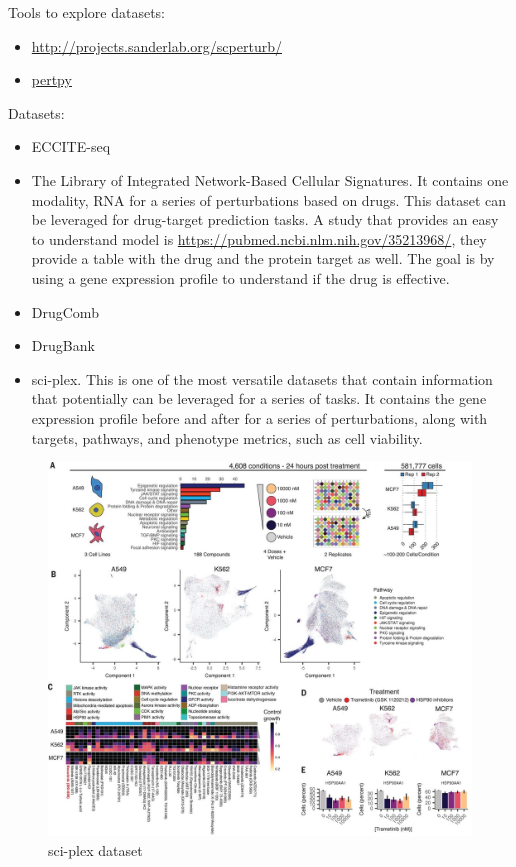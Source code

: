 \documentclass[12pt, a4paper]{article}
\begin{document}
Tools to explore datasets:
\begin{itemize}
  \item \url{http://projects.sanderlab.org/scperturb/}
  \item \href{https://github.com/scverse/pertpy}{pertpy}
\end{itemize}

Datasets:
\begin{itemize}
  \item ECCITE-seq
  \item The Library of Integrated Network-Based Cellular Signatures. It contains one modality, RNA for a series of perturbations based on drugs. This dataset can be leveraged for drug-target prediction tasks. A study that provides an easy to understand model is \url{https://pubmed.ncbi.nlm.nih.gov/35213968/}, they provide a table with the drug and the protein target as well. The goal is by using a gene expression profile to understand if the drug is effective.
  \item DrugComb
  \item DrugBank
  \item sci-plex. This is one of the most versatile datasets that contain information that potentially can be leveraged for a series of tasks. It contains the gene expression profile before and after for a series of perturbations, along with targets, pathways, and phenotype metrics, such as cell viability.
\end{itemize}

\begin{figure}[h!]
  \centering
  \includegraphics[width=.8\textwidth]{sci-plex.jpeg}
  \caption{sci-plex dataset}
\end{figure}
\end{document}
